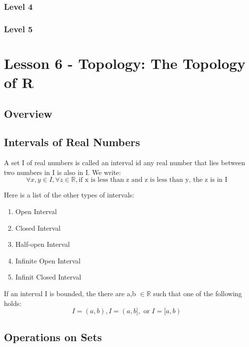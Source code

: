 \documentclass{article}
\begin{document}
\subsubsection{Level 4}
\subsubsection{Level 5}
\pagebreak

\section{Lesson 6 - Topology: The Topology of R}

\subsection{Overview}

\subsection{Intervals of Real Numbers}

\begin{definition}[Interval]
    A set I of real numbers is called an interval id any real number that lies
    between two numbers in I is also in I. We write:
    $$ \forall x, y \in I, \forall z \in \mathbb{R}, \text{if x is less than z
    and z is less than y, the z is in I} $$

    Here is a list of the other types of intervals:
    \begin{enumerate}
	\item Open Interval
	\item Closed Interval
	\item Half-open Interval
	\item Infinite Open Interval
	\item Infinit Closed Interval
    \end{enumerate}

\end{definition}

\begin{theorem}
    If an interval I is bounded, the there are a,b $\in \mathbb{R} $ such that
    one of the following holds:
    $$ I=(a,b), I=(a,b], \text{ or } I=[a,b) $$
\end{theorem}

\subsection{Operations on Sets}
\end{document}
